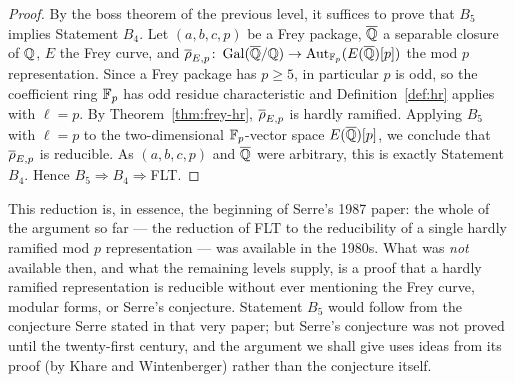 \documentclass[11pt]{article}
\begin{document}
\begin{proof}
By the boss theorem of the previous level, it suffices to prove that $B_5$
implies Statement $B_4$. Let $(a,b,c,p)$ be a Frey package, $\overline{\mathbb{Q}}$ a separable
closure of $\mathbb{Q}$, $E$ the Frey curve, and
$\overline{\rho}_{E,p}\colon\operatorname{Gal}(\overline{\mathbb{Q}}/\mathbb{Q})\to\operatorname{Aut}_{\mathbb{F}_p}(E(\overline{\mathbb{Q}})[p])$ the mod $p$ representation.
Since a Frey package has $p\geq5$, in particular $p$ is odd, so the
coefficient ring $\mathbb{F}_p$ has odd residue characteristic and
Definition~\ref{def:hr} applies with $\ell=p$. By Theorem~\ref{thm:frey-hr},
$\overline{\rho}_{E,p}$ is hardly ramified. Applying $B_5$ with $\ell=p$ to the
two-dimensional $\mathbb{F}_p$-vector space $E(\overline{\mathbb{Q}})[p]$, we conclude that
$\overline{\rho}_{E,p}$ is reducible. As $(a,b,c,p)$ and $\overline{\mathbb{Q}}$ were arbitrary, this
is exactly Statement $B_4$. Hence $B_5\Rightarrow B_4\Rightarrow{}$FLT.
\end{proof}

\begin{remark}
This reduction is, in essence, the beginning of Serre's 1987 paper: the whole
of the argument so far --- the reduction of FLT to the reducibility of a single
hardly ramified mod $p$ representation --- was available in the 1980s. What was
\emph{not} available then, and what the remaining levels supply, is a proof
that a hardly ramified representation is reducible without ever mentioning the
Frey curve, modular forms, or Serre's conjecture. Statement $B_5$ would follow
from the conjecture Serre stated in that very paper; but Serre's conjecture was
not proved until the twenty-first century, and the argument we shall give uses
ideas from its proof (by Khare and Wintenberger) rather than the conjecture
itself.
\end{remark}
\end{document}
